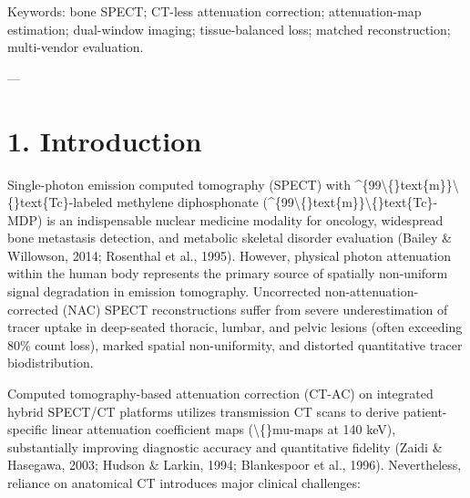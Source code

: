 \documentclass[11pt]{article}
\begin{document}
Keywords: bone SPECT; CT-less attenuation correction; attenuation-map estimation; dual-window imaging; tissue-balanced loss; matched reconstruction; multi-vendor evaluation.\par

---\par

\section*{1. Introduction}
Single-photon emission computed tomography (SPECT) with \textasciicircum{}\{99\textbackslash\{\}text\{m\}\}\textbackslash\{\}text\{Tc\}-labeled methylene diphosphonate (\textasciicircum{}\{99\textbackslash\{\}text\{m\}\}\textbackslash\{\}text\{Tc\}-MDP) is an indispensable nuclear medicine modality for oncology, widespread bone metastasis detection, and metabolic skeletal disorder evaluation (Bailey \& Willowson, 2014; Rosenthal et al., 1995). However, physical photon attenuation within the human body represents the primary source of spatially non-uniform signal degradation in emission tomography. Uncorrected non-attenuation-corrected (NAC) SPECT reconstructions suffer from severe underestimation of tracer uptake in deep-seated thoracic, lumbar, and pelvic lesions (often exceeding 80\% count loss), marked spatial non-uniformity, and distorted quantitative tracer biodistribution.\par

Computed tomography-based attenuation correction (CT-AC) on integrated hybrid SPECT/CT platforms utilizes transmission CT scans to derive patient-specific linear attenuation coefficient maps (\textbackslash\{\}mu-maps at 140 keV), substantially improving diagnostic accuracy and quantitative fidelity (Zaidi \& Hasegawa, 2003; Hudson \& Larkin, 1994; Blankespoor et al., 1996). Nevertheless, reliance on anatomical CT introduces major clinical challenges:\par
\end{document}
